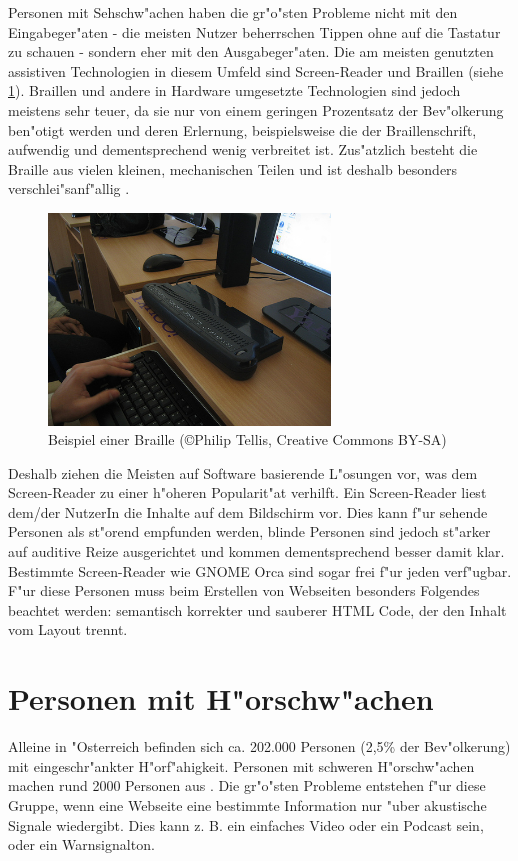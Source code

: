 \documentclass[a4paper,bibtotoc,oneside]{scrbook}
\begin{document}
Personen mit Sehschw"achen haben die gr"o"sten Probleme nicht mit den Eingabeger"aten - die meisten Nutzer beherrschen Tippen ohne auf die Tastatur zu schauen - sondern eher mit den Ausgabeger"aten. Die am meisten genutzten assistiven Technologien in diesem Umfeld sind Screen-Reader und Braillen (siehe \ref{Abb1}). Braillen und andere in Hardware umgesetzte Technologien sind jedoch meistens sehr teuer, da sie nur von einem geringen Prozentsatz der Bev"olkerung ben"otigt werden und deren Erlernung, beispielsweise die der Braillenschrift, aufwendig und dementsprechend wenig verbreitet ist\cite[S. 249-250]{screen_read_frust}.
Zus"atzlich besteht die Braille aus vielen kleinen, mechanischen Teilen und ist deshalb besonders verschlei"sanf"allig \cite[S. 11]{barr_webd}.

\begin{figure}[braille]
\centering
\includegraphics[width=75mm]{braille}
\caption[Beispiel einer Braille]{Beispiel einer Braille (\copyright  Philip Tellis, Creative Commons BY-SA)}\label{Abb1}
\end{figure}

Deshalb ziehen die Meisten auf Software basierende L"osungen vor, was dem Screen-Reader zu einer h"oheren Popularit"at verhilft\cite[S. 249-250]{screen_read_frust}. Ein Screen-Reader liest dem/der NutzerIn die Inhalte auf dem Bildschirm vor. Dies kann f"ur sehende Personen als st"orend empfunden werden, blinde Personen sind jedoch st"arker auf auditive Reize ausgerichtet und kommen dementsprechend besser damit klar\cite[S. 13]{barr_webd}. Bestimmte Screen-Reader wie GNOME Orca \cite{orca} sind sogar frei f"ur jeden verf"ugbar. 
F"ur diese Personen muss beim Erstellen von Webseiten besonders Folgendes beachtet werden: semantisch korrekter und sauberer HTML Code, der den Inhalt vom Layout trennt.\cite[S. 13-15]{barr_webd}

\section{Personen mit H"orschw"achen}
Alleine in "Osterreich befinden sich ca. 202.000 Personen (2,5\% der Bev"olkerung) mit eingeschr"ankter H"orf"ahigkeit. Personen mit schweren H"orschw"achen machen rund 2000 Personen aus \cite[S. 13-14]{stat_austria}. Die gr"o"sten Probleme entstehen f"ur diese Gruppe, wenn eine Webseite eine bestimmte Information nur "uber akustische Signale wiedergibt. Dies kann z. B. ein einfaches Video oder ein Podcast sein, oder ein Warnsignalton. \cite[S. 17]{barr_webd}\cite[S. 20]{understand_acc}
\end{document}
